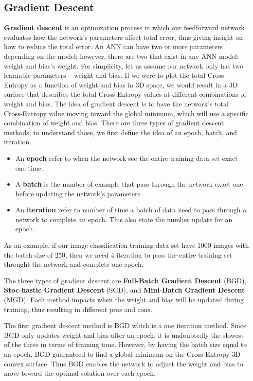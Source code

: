 \subsection{Gradient Descent}
\textbf{Gradient descent} is an optimization process in which our feedforward network evaluates how the network's parameters affect total error, thus giving insight on how to reduce the total error. An ANN can have two or more parameters depending on the model; however, there are two that exist in any ANN model: weight and bias's weight. For simplicity, let us assume our network only has two learnable parameters -- weight and bias. If we were to plot the total Cross-Entropy as a function of weight and bias in 3D space, we would result in a 3D surface that describes the total Cross-Entropy values at different combinations of weight and bias. The idea of gradient descent is to have the network's total Cross-Entropy value moving toward the global minimum, which will use a specific combination of weight and bias. There are three types of gradient descent methods; to understand those, we first define the idea of an epoch, batch, and iteration.
%
\begin{itemize}
    \item An \textbf{epoch} refer to when the network see the entire training data set exact one time.
    \item A \textbf{batch} is the number of example that pass through the network exact one before updating the network's parameters.
    \item An \textbf{iteration} refer to number of time a batch of data need to pass through a network to complete an epoch. This also state the number update for an epoch.
\end{itemize}
%
As an example, if our image classification training data set have 1000 images with the batch size of 250, then we need 4 iteration to pass the entire training set throught the network and complete one epoch.

The three types of gradient descent are \textbf{Full-Batch Gradient Descent} (BGD), \textbf{Stoc-hastic Gradient Descent} (SGD), and \textbf{Mini-Batch Gradient Descent} (MGD). Each method impacts when the weight and bias will be updated during training, thus resulting in different pros and cons.

The first gradient descent method is BGD which is a one iteration method. Since BGD only updates weight and bias after an epoch, it is undoubtedly the slowest of the three in terms of training time. However, by having the batch size equal to an epoch, BGD guaranteed to find a global minimum on the Cross-Entropy 3D convex surface. Thus BGD enables the network to adjust the weight and bias to move toward the optimal solution over each epoch.

